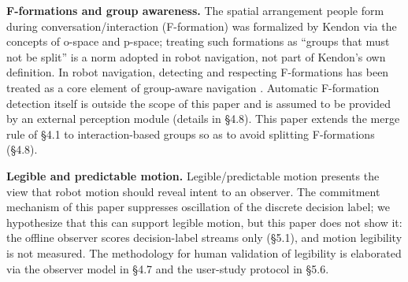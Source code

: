 \documentclass[11pt]{article}
\begin{document}
\textbf{F-formations and group awareness.} The spatial arrangement people form during conversation/interaction (F-formation) was formalized by Kendon \cite{kendon1990conducting} via the concepts of o-space and p-space; treating such formations as ``groups that must not be split'' is a norm adopted in robot navigation, not part of Kendon's own definition. In robot navigation, detecting and respecting F-formations has been treated as a core element of group-aware navigation \cite{riosmartinez2015survey}. Automatic F-formation detection itself is outside the scope of this paper and is assumed to be provided by an external perception module (details in \S4.8). This paper extends the merge rule of \S4.1 to interaction-based groups so as to avoid splitting F-formations (\S4.8).

\textbf{Legible and predictable motion.} Legible/predictable motion \cite{dragan2013legibility} presents the view that robot motion should reveal intent to an observer. The commitment mechanism of this paper suppresses oscillation of the discrete decision label; we hypothesize that this can support legible motion, but this paper does not show it: the offline observer scores decision-label streams only (\S5.1), and motion legibility is not measured. The methodology for human validation of legibility is elaborated via the observer model in \S4.7 and the user-study protocol in \S5.6.
\end{document}
